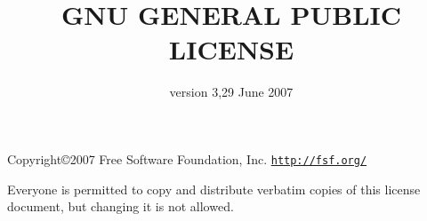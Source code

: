 \documentclass[a4paper]{article}
\title{GNU GENERAL PUBLIC LICENSE}
\date{version 3,29 June 2007}
\author{}
\begin{document}
\maketitle
{}	%
\hfuzz=18pt	%


Copyright\copyright 2007 Free Software Foundation, Inc. 
\texttt{\url{http://fsf.org/}}

Everyone is permitted to copy and distribute verbatim copies of this license document, but changing it is not allowed.






	
\end{document}
